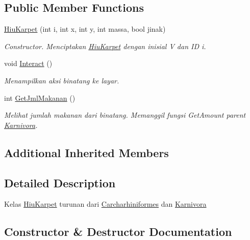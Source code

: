 \subsection*{Public Member Functions}
\begin{DoxyCompactItemize}
\item 
\hyperlink{classHiuKarpet_ac1589c25b08eb4b0d33deec9e5dcabc5}{Hiu\+Karpet} (int i, int x, int y, int massa, bool jinak)
\begin{DoxyCompactList}\small\item\em Constructor. Menciptakan \hyperlink{classHiuKarpet}{Hiu\+Karpet} dengan inisial \textquotesingle{}V\textquotesingle{} dan ID i. \end{DoxyCompactList}\item 
void \hyperlink{classHiuKarpet_a5aecaaf80c31e829c06abb3f90ad47da}{Interact} ()\hypertarget{classHiuKarpet_a5aecaaf80c31e829c06abb3f90ad47da}{}\label{classHiuKarpet_a5aecaaf80c31e829c06abb3f90ad47da}

\begin{DoxyCompactList}\small\item\em Menampilkan aksi binatang ke layar. \end{DoxyCompactList}\item 
int \hyperlink{classHiuKarpet_abcb51ba250304ab5b9a0a649c1e705d1}{Get\+Jml\+Makanan} ()
\begin{DoxyCompactList}\small\item\em Melihat jumlah makanan dari binatang. Memanggil fungsi Get\+Amount parent \hyperlink{classKarnivora}{Karnivora}. \end{DoxyCompactList}\end{DoxyCompactItemize}
\subsection*{Additional Inherited Members}


\subsection{Detailed Description}
Kelas \hyperlink{classHiuKarpet}{Hiu\+Karpet} turunan dari \hyperlink{classCarcharhiniformes}{Carcharhiniformes} dan \hyperlink{classKarnivora}{Karnivora} 

\subsection{Constructor \& Destructor Documentation}
